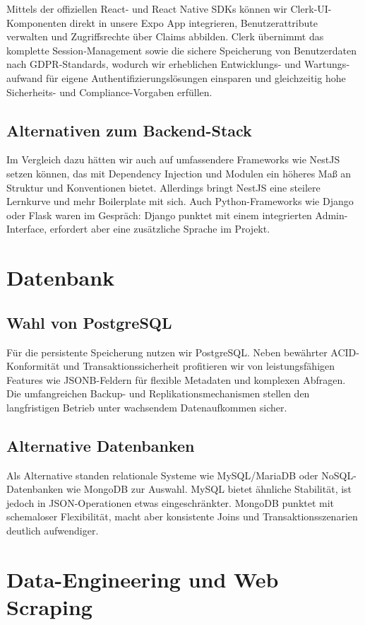 \documentclass[12pt, a4paper]{report} %
\begin{document}
Mittels der offiziellen React- und React Native SDKs können wir Clerk‑UI-Komponenten direkt in unsere Expo App integrieren, Benutzerattribute verwalten und Zugriffsrechte über Claims abbilden. Clerk übernimmt das komplette Session‑Management sowie die sichere Speicherung von Benutzerdaten nach GDPR‑Standards, wodurch wir erheblichen Entwicklungs- und Wartungs­aufwand für eigene Authentifizierungslösungen einsparen und gleichzeitig hohe Sicherheits- und Compliance-Vorgaben erfüllen.

\subsection{Alternativen zum Backend-Stack}
Im Vergleich dazu hätten wir auch auf umfassendere Frameworks wie NestJS setzen können, das mit Dependency Injection und Modulen ein höheres Maß an Struktur und Konventionen bietet. Allerdings bringt NestJS eine steilere Lernkurve und mehr Boilerplate mit sich. Auch Python-Frameworks wie Django oder Flask waren im Gespräch: Django punktet mit einem integrierten Admin-Interface, erfordert aber eine zusätzliche Sprache im Projekt.

\section{Datenbank}
\subsection{Wahl von PostgreSQL}
Für die persistente Speicherung nutzen wir PostgreSQL. Neben bewährter ACID-Konformität und Transaktions­sicherheit profitieren wir von leistungsfähigen Features wie JSONB-Feldern für flexible Metadaten und komplexen Abfragen. Die umfangreichen Backup- und Replikations­mechanismen stellen den langfristigen Betrieb unter wachsendem Datenaufkommen sicher.

\subsection{Alternative Datenbanken}
Als Alternative standen relationale Systeme wie MySQL/MariaDB oder NoSQL-Datenbanken wie MongoDB zur Auswahl. MySQL bietet ähnliche Stabilität, ist jedoch in JSON-Operationen etwas eingeschränkter. MongoDB punktet mit schemaloser Flexibilität, macht aber konsistente Joins und Transaktions­szenarien deutlich aufwendiger.

\section{Data-Engineering und Web Scraping}
\end{document}
